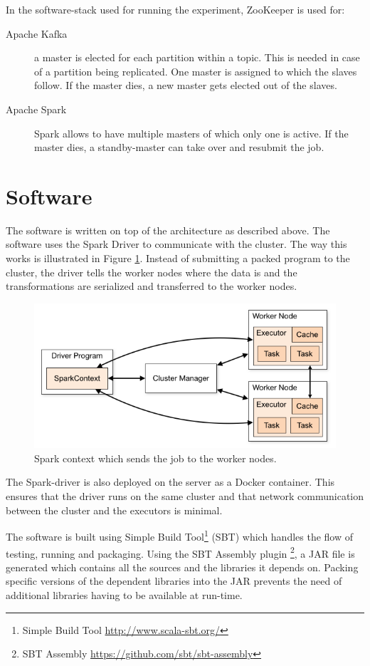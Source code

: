In the software-stack used for running the experiment, ZooKeeper is used for:
\begin{description} 
    \item[Apache Kafka] a master is elected for each partition within a topic. This is needed in case of a partition being replicated. One master is assigned to which the slaves follow. If the master dies, a new master gets elected out of the slaves. 
    \item[Apache Spark] Spark allows to have multiple masters of which only one is active. If the master dies, a standby-master can take over and resubmit the job.
\end{description}

\section{Software}
The software is written on top of the architecture as described above. The software uses the Spark Driver to communicate with the cluster. The way this works is illustrated in Figure \ref{fig:driver}. Instead of submitting a packed program to the cluster, the driver tells the worker nodes where the data is and the transformations are serialized and transferred to the worker nodes.

\begin{figure}[ht!]
\centering
\includegraphics[width=\textwidth]{figures/clusterdriver.png}
\caption{Spark context which sends the job to the worker nodes. \label{fig:driver}}
\end{figure}

The Spark-driver is also deployed on the server as a Docker container. This ensures that the driver runs on the same cluster and that network communication between the cluster and the executors is minimal.

The software is built using Simple Build Tool\footnote{Simple Build Tool \url{http://www.scala-sbt.org/}} (SBT) which handles the flow of testing, running and packaging. Using the SBT Assembly plugin \footnote{SBT Assembly \url{https://github.com/sbt/sbt-assembly}}, a JAR file is generated which contains all the sources and the libraries it depends on. Packing specific versions of the dependent libraries into the JAR prevents the need of additional libraries having to be available at run-time.

